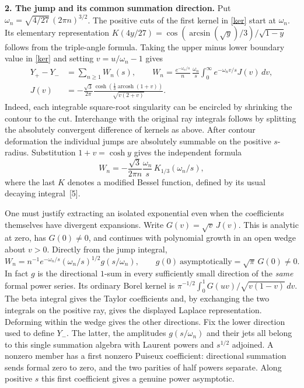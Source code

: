 \documentclass[11pt]{article}
\newcommand{\head}[1]{\par\medskip\noindent\textbf{#1}\quad}
\begin{document}
\head{2. The jump and its common summation direction.}
Put $\omega_n=\sqrt{4/27}\,(2\pi n)^{3/2}$. The positive cuts of the first kernel in \eqref{ker} start at $\omega_n$. Its elementary representation $K(4y/27)=\cos(\arcsin(\sqrt y)/3)/\sqrt{1-y}$ follows from the triple-angle formula. Taking the upper minus lower boundary value in \eqref{ker} and setting $v=u/\omega_n-1$ gives
\begin{align}
 Y_+-Y_- &=\sum_{n\geq1}W_n(s),\qquad
 W_n=\frac{e^{-\omega_n/s}}n\,\frac{\omega_n}{s}
 \int_0^\infty e^{-\omega_n v/s}J(v)\,dv,\\
 J(v)&=-\frac{\sqrt3}{2\pi}
 \frac{\cosh(\tfrac13\operatorname{arcosh}(1+v))}{\sqrt{v(2+v)}}.
\end{align}
Indeed, each integrable square-root singularity can be encircled by shrinking the contour to the cut. Interchange with the original ray integrals follows by splitting the absolutely convergent difference of kernels as above. After contour deformation the individual jumps are absolutely summable on the positive $s$-radius. Substitution $1+v=\cosh y$ gives the independent formula
\[
 W_n=-\frac{\sqrt3}{2\pi n}\frac{\omega_n}{s}\,
                  K_{1/3}(\omega_n/s),
\]
where the last $K$ denotes a modified Bessel function, defined by its usual decaying integral~[5].

One must justify extracting an isolated exponential even when the coefficients themselves have divergent expansions. Write $G(v)=\sqrt v\,J(v)$. This is analytic at zero, has $G(0)\ne0$, and continues with polynomial growth in an open wedge about $v>0$. Directly from the jump integral,
\[
 W_n=n^{-1}e^{-\omega_n/s}(\omega_n/s)^{1/2} g(s/\omega_n),
 \qquad g(0)\ \text{asymptotically}=\sqrt\pi\,G(0)\ne0 .
\]
In fact $g$ is the directional $1$-sum in every sufficiently small direction of the \emph{same} formal power series. Its ordinary Borel kernel is
$\pi^{-1/2}\int_0^1 G(uv)/\sqrt{v(1-v)}\,dv$.
The beta integral gives the Taylor coefficients and, by exchanging the two integrals on the positive ray, gives the displayed Laplace representation. Deforming within the wedge gives the other directions. Fix the lower direction used to define $Y_-$. The latter, the amplitudes $g(s/\omega_n)$ and their jets all belong to this single summation algebra with Laurent powers and $s^{1/2}$ adjoined. A nonzero member has a first nonzero Puiseux coefficient: directional summation sends formal zero to zero, and the two parities of half powers separate. Along positive $s$ this first coefficient gives a genuine power asymptotic.
\end{document}
